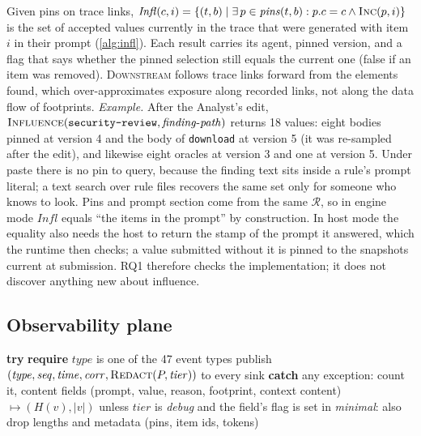 \documentclass[10pt,conference]{IEEEtran}
\theoremstyle{definition}
\newcommand{\code}[1]{\texttt{#1}}
\newcommand{\Infl}{\mathit{Infl}}
\newcommand{\pol}[1]{\textsf{#1}} %
\begin{document}
Given pins on trace links, $\Infl(c,i)=\{(t,b)\mid\exists\,p\in\mathit{pins}(t,b): p.c=c\wedge
\textsc{Inc}(p,i)\}$ is the set of accepted values currently in the trace that were generated with item $i$
in their prompt (\cref{alg:infl}). Each result carries its agent, pinned version, and a flag that says whether
the pinned selection still equals the current one (false if an item was removed). \textsc{Downstream} follows
trace links forward from the elements found, which over-approximates exposure along recorded links, not along
the data flow of footprints. \emph{Example.} After the Analyst's edit, $\textsc{Influence}(\code{security-review},
\mathit{finding\text{-}path})$ returns 18 values: eight bodies pinned at version 4 and the body of
\code{download} at version 5 (it was re-sampled after the edit), and likewise eight oracles at version 3 and one
at version 5. Under \pol{paste} there is no pin to query, because the finding text sits inside a rule's prompt
literal; a text search over rule files recovers the same set only for someone who knows to look. Pins and
prompt section come from the same $\mathcal{R}$, so in engine mode $\Infl$ equals ``the items in the prompt''
by construction. In host mode the equality also needs the host to return the stamp of the prompt it answered,
which the runtime then checks; a value submitted without it is pinned to the snapshots current at submission.
RQ1 therefore checks the implementation; it does not discover anything new about influence.

\subsection{Observability plane}\label{sec:obs}

\begin{algorithm}[t]
\caption{The single emission point}
\label{alg:emit}
\small
\begin{algorithmic}[1]
  \State \textbf{try} \textbf{require} $\mathit{type}$ is one of the 47 event types
  \State \quad publish $(\mathit{type},\mathit{seq},\mathit{time},\mathit{corr},\Call{Redact}{P,\mathit{tier}})$ to every sink
  \State \textbf{catch} any exception: count it, \Return {}
\EndFunction
{}
  \State content fields (prompt, value, reason, footprint, context content) $\mapsto(H(v),|v|)$
         unless $\mathit{tier}$ is \emph{debug} and the field's flag is set
  \State in \emph{minimal}: also drop lengths and metadata (pins, item ids, tokens)
\EndFunction
\end{algorithmic}
\end{algorithm}
\end{document}
